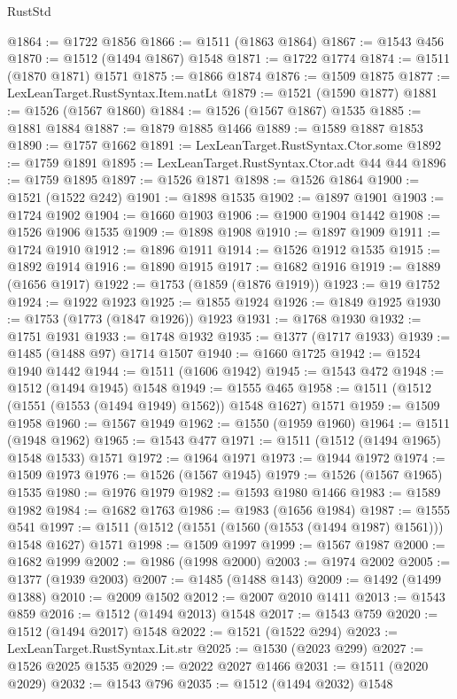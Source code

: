 \begin{lexlean}{RustStd}
\begin{coremodule}
{\begin{coremodule}
{{{{{{{{{{{{{{{{{{{{{{{{{{{{{{{{{{{@1864 := @1722 @1856
@1866 := @1511 (@1863 @1864)
@1867 := @1543 @456
@1870 := @1512 (@1494 @1867) @1548
@1871 := @1722 @1774
@1874 := @1511 (@1870 @1871) @1571
@1875 := @1866 @1874
@1876 := @1509 @1875
@1877 := LexLeanTarget.RustSyntax.Item.natLt
@1879 := @1521 (@1590 @1877)
@1881 := @1526 (@1567 @1860)
@1884 := @1526 (@1567 @1867) @1535
@1885 := @1881 @1884
@1887 := @1879 @1885 @1466
@1889 := @1589 @1887 @1853
@1890 := @1757 @1662
@1891 := LexLeanTarget.RustSyntax.Ctor.some
@1892 := @1759 @1891
@1895 := LexLeanTarget.RustSyntax.Ctor.adt @44 @44
@1896 := @1759 @1895
@1897 := @1526 @1871
@1898 := @1526 @1864
@1900 := @1521 (@1522 @242)
@1901 := @1898 @1535
@1902 := @1897 @1901
@1903 := @1724 @1902
@1904 := @1660 @1903
@1906 := @1900 @1904 @1442
@1908 := @1526 @1906 @1535
@1909 := @1898 @1908
@1910 := @1897 @1909
@1911 := @1724 @1910
@1912 := @1896 @1911
@1914 := @1526 @1912 @1535
@1915 := @1892 @1914
@1916 := @1890 @1915
@1917 := @1682 @1916
@1919 := @1889 (@1656 @1917)
@1922 := @1753 (@1859 (@1876 @1919))
@1923 := @19 @1752
@1924 := @1922 @1923
@1925 := @1855 @1924
@1926 := @1849 @1925
@1930 := @1753 (@1773 (@1847 @1926)) @1923
@1931 := @1768 @1930
@1932 := @1751 @1931
@1933 := @1748 @1932
@1935 := @1377 (@1717 @1933)
@1939 := @1485 (@1488 @97) @1714 @1507
@1940 := @1660 @1725
@1942 := @1524 @1940 @1442
@1944 := @1511 (@1606 @1942)
@1945 := @1543 @472
@1948 := @1512 (@1494 @1945) @1548
@1949 := @1555 @465
@1958 := @1511 (@1512 (@1551 (@1553 (@1494 @1949) @1562)) @1548 @1627) @1571
@1959 := @1509 @1958
@1960 := @1567 @1949
@1962 := @1550 (@1959 @1960)
@1964 := @1511 (@1948 @1962)
@1965 := @1543 @477
@1971 := @1511 (@1512 (@1494 @1965) @1548 @1533) @1571
@1972 := @1964 @1971
@1973 := @1944 @1972
@1974 := @1509 @1973
@1976 := @1526 (@1567 @1945)
@1979 := @1526 (@1567 @1965) @1535
@1980 := @1976 @1979
@1982 := @1593 @1980 @1466
@1983 := @1589 @1982
@1984 := @1682 @1763
@1986 := @1983 (@1656 @1984)
@1987 := @1555 @541
@1997 := @1511 (@1512 (@1551 (@1560 (@1553 (@1494 @1987) @1561))) @1548 @1627) @1571
@1998 := @1509 @1997
@1999 := @1567 @1987
@2000 := @1682 @1999
@2002 := @1986 (@1998 @2000)
@2003 := @1974 @2002
@2005 := @1377 (@1939 @2003)
@2007 := @1485 (@1488 @143)
@2009 := @1492 (@1499 @1388)
@2010 := @2009 @1502
@2012 := @2007 @2010 @1411
@2013 := @1543 @859
@2016 := @1512 (@1494 @2013) @1548
@2017 := @1543 @759
@2020 := @1512 (@1494 @2017) @1548
@2022 := @1521 (@1522 @294)
@2023 := LexLeanTarget.RustSyntax.Lit.str
@2025 := @1530 (@2023 @299)
@2027 := @1526 @2025 @1535
@2029 := @2022 @2027 @1466
@2031 := @1511 (@2020 @2029)
@2032 := @1543 @796
@2035 := @1512 (@1494 @2032) @1548
}}}}}}}}}}}}}}}}}}}}}}}}}}}}}}}}}}}
\end{coremodule}}
\end{coremodule}
\end{lexlean}
